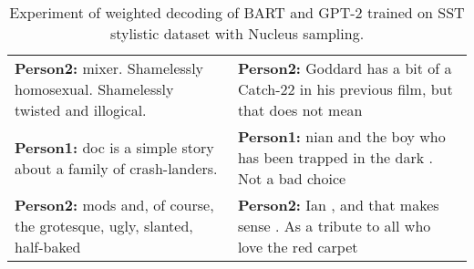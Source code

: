 \begin{table}[H]
\begin{tabular}{|p{7cm}|p{7cm}|}
 \textbf{Person2:} mixer. Shamelessly homosexual. Shamelessly twisted and illogical. & \textbf{Person2:} Goddard has a bit of a Catch-22 in his previous film, but that does not mean \\
 \textbf{Person1:} doc is a simple story about a family of crash-landers. & \textbf{Person1:} nian and the boy who has been trapped in the dark .  Not a bad choice \\
 \textbf{Person2:} mods and, of course, the grotesque, ugly, slanted, half-baked & \textbf{Person2:}  Ian , and that makes sense .  As a tribute to all who love the red carpet \\
 \hline
 \end{tabular}
 \caption{Experiment of weighted decoding of BART and GPT-2 trained on SST stylistic dataset with Nucleus sampling.}
\label{tab:sst_wd_nucleus}
\end{table}